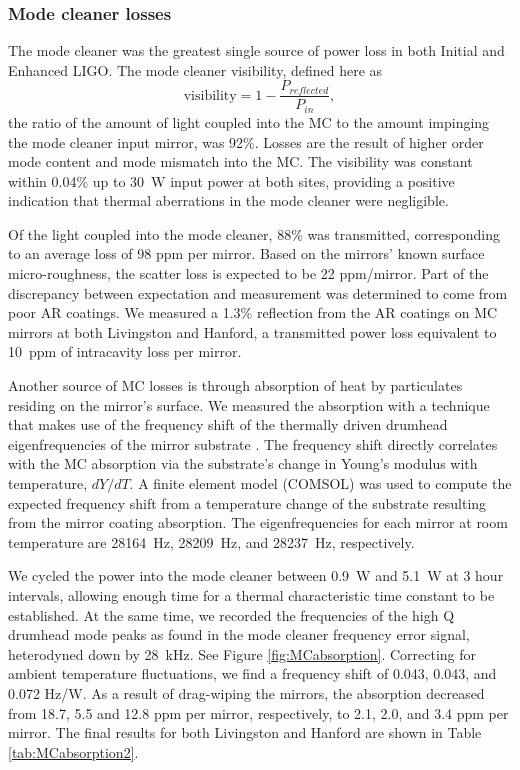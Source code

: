 \subsubsection{Mode cleaner losses} 
The mode cleaner was the greatest single source of power loss in both
Initial and Enhanced LIGO. The mode cleaner visibility, defined here as
\begin{equation}
\mbox{visibility} = 1 - \frac{P_{reflected}}{P_{in}},
\end{equation}
the ratio of the amount of light coupled into the MC to the amount
impinging the mode cleaner input mirror, was 92\%. Losses are the result of higher
order mode content and mode mismatch into the MC. The visibility was
constant within 0.04\% up to 30~W input power at both sites, providing a positive
indication that thermal aberrations in the mode cleaner were
negligible. 

Of the light coupled into the mode cleaner, 88\% was transmitted,
corresponding to an average loss of 98 ppm per mirror. Based on the
mirrors' known surface micro-roughness, the scatter loss is expected
to be 22 ppm/mirror. Part of the discrepancy between expectation and
measurement was determined to come from poor AR coatings. We measured
a 1.3\% reflection from the AR coatings on MC mirrors at both
Livingston and Hanford, a transmitted power loss equivalent to 10~ppm
of intracavity loss per mirror.

Another source of MC losses is through absorption of heat by
particulates residing on the mirror's surface. We measured the
absorption with a technique that makes use of the frequency shift of
the thermally driven drumhead eigenfrequencies of the mirror substrate
\citep{Punturo2007Mirror}. The frequency shift directly correlates with
the MC absorption via the substrate's change in Young's modulus with
temperature, $dY/dT$. A finite element model (COMSOL) was used to
compute the expected frequency shift from a temperature change of the
substrate resulting from the mirror coating absorption. The
eigenfrequencies for each mirror at room temperature are 28164~Hz,
28209~Hz, and 28237~Hz, respectively.

We cycled the power into the mode cleaner between 0.9~W and 5.1~W at 3
hour intervals, allowing enough time for a thermal characteristic time
constant to be established.  At the same time, we recorded the
frequencies of the high Q drumhead mode peaks as found in the mode
cleaner frequency error signal, heterodyned down by 28~kHz. See Figure
\ref{fig:MCabsorption}. Correcting for ambient temperature
fluctuations, we find a frequency shift of 0.043, 0.043, and 0.072
Hz/W. As a result of drag-wiping the mirrors, the absorption decreased
from 18.7, 5.5 and 12.8 ppm per mirror, respectively, to 2.1, 2.0, and
3.4 ppm per mirror. The final results for both Livingston and Hanford
are shown in Table \ref{tab:MCabsorption2}.

